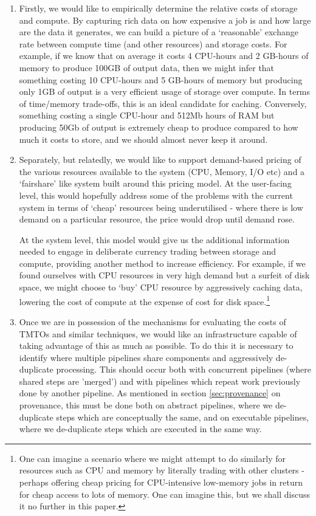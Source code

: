 \documentclass[10pt,a4paper]{article}
\begin{document}
\begin{enumerate}
\item Firstly, we would like to empirically determine the relative costs of storage and compute. By capturing rich data on how expensive a job is and how large are the data it generates, we can build a picture of a `reasonable' exchange rate between compute time (and other resources) and storage costs. For example, if we know that on average it costs 4 CPU-hours and 2 GB-hours of memory to produce 100GB of output data, then we might infer that something costing 10 CPU-hours and 5 GB-hours of memory but producing only 1GB of output is a very efficient usage of storage over compute. In terms of time/memory trade-offs, this is an ideal candidate for caching. Conversely, something costing a single CPU-hour and 512Mb hours of RAM but producing 50Gb of output is extremely cheap to produce compared to how much it costs to store, and we should almost never keep it around.
\item Separately, but relatedly, we would like to support demand-based pricing of the various resources available to the system (CPU, Memory, I/O etc) and a `fairshare' like system built around this pricing model. At the user-facing level, this would hopefully address some of the problems with the current system in terms of `cheap' resources being underutilised - where there is low demand on a particular resource, the price would drop until demand rose.

At the system level, this model would give us the additional information needed to engage in deliberate currency trading between storage and compute, providing another method to increase efficiency. For example, if we found ourselves with CPU resources in very high demand but a surfeit of disk space, we might choose to `buy' CPU resource by aggressively caching data, lowering the cost of compute at the expense of cost for disk space.\footnote{One can imagine a scenario where we might attempt to do similarly for resources such as CPU and memory by literally trading with other clusters - perhaps offering cheap pricing for CPU-intensive low-memory jobs in return for cheap access to lots of memory. One can imagine this, but we shall discuss it no further in this paper.}
\item Once we are in possession of the mechanisms for evaluating the costs of TMTOs and similar techniques, we would like an infrastructure capable of taking advantage of this as much as possible. To do this it is necessary to identify where multiple pipelines share components and aggressively de-duplicate processing. This should occur both with concurrent pipelines (where shared steps are 'merged') and with pipelines which repeat work previously done by another pipeline. As mentioned in section \ref{sec:provenance} on provenance, this must be done both on abstract pipelines, where we de-duplicate steps which are conceptually the same, and on executable pipelines, where we de-duplicate steps which are executed in the same way.


\end{enumerate}
\end{document}
